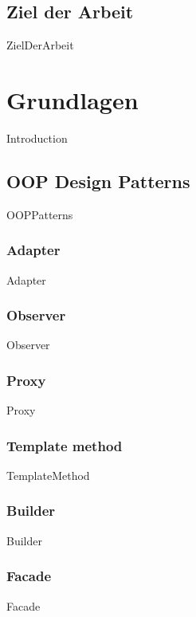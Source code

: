 \documentclass{article}
\begin{document}
    \subsection{Ziel der Arbeit}
        {ZielDerArbeit}

\newpage
\section{Grundlagen}
    {Introduction}

    \subsection{OOP Design Patterns}
        {OOPPatterns}
        
        \subsubsection{Adapter}
        \label{kap:gof:adapter}
            {Adapter}
        \newpage
        \subsubsection{Observer}
        \label{kap:gof:observer}
            {Observer}

        \subsubsection{Proxy}
        \label{kap:gof:proxy}
            {Proxy}

        \subsubsection{Template method}
        \label{kap:gof:templatemethod}
            {TemplateMethod}

        \subsubsection{Builder}
        \label{kap:gof:builder}
            {Builder}

        \subsubsection{Facade}
        \label{kap:gof:facade}
            {Facade}
\end{document}
